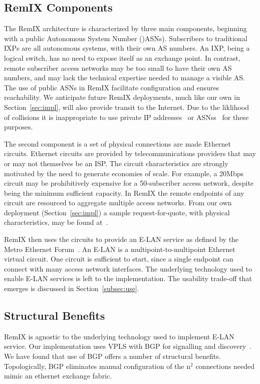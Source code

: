 \subsection{RemIX Components}

The RemIX architecture is characterized by three main components, beginning with
a public Autonomous System Number ()\acp{ASN}). Subscribers to traditional IXPs
are all autonomous systems, with their own AS numbers. An IXP, being a logical
switch, has no need to expose itself as an exchange point. In contrast, remote
subscriber access networks may be too small to have their own AS numbers, and
may lack the technical expertise needed to manage a visible AS. The use of
public ASNs in RemIX facilitate configuration and ensures reachability. We
anticipate future RemIX deployments, much like our own in
Section~\ref{sec:impl}, will also provide transit to the Internet. Due to the
liklihood of collisions it is inappropriate to use private IP
addresses~\cite{rfc1918} or \acp{ASN}s~\cite{rfc6996} for these purposes.

The second component is a set of physical connections are made Ethernet
circuits. Ethernet circuits are provided by telecommunications providers that
may or may not themselves be an ISP. The circuit characteristics are strongly
motivated by the need to generate economies of scale. For example, a 20Mbps
circuit may be prohibitively expensive for a 50-subscriber access network,
despite being the minimum sufficient capacity. In RemIX the remote endpoints of
any circuit are resourced to aggregate multiple access networks. From our own
deployment (Section~\ref{sec:impl}) a sample request-for-quote, with physical
characteristics, may be found at~\cite{rfq}.

RemIX then uses the circuits to provide an E-LAN service as defined by the Metro
Ethernet Forum~\cite{mef62}. An E-LAN is a multipoint-to-multipoint Ethernet
virtual circuit. One circuit is sufficient to start, since a single endpoint can
connect with many access network interfaces. The underlying technology used to
enable E-LAN services is left to the implementation. The usability trade-off 
that emerges is discussed in Section~\ref{subsec:use}.

\subsection{Structural Benefits}

RemIX is agnostic to the underlying technology used to implement E-LAN service.
Our implementation uses VPLS with BGP for signalling and
discovery~\cite{vpls-bgp}. We have found that use of BGP offers a number of
structural benefits. Topologically, BGP eliminates manual configuration of the
n$^2$ connections needed mimic an ethernet exchange fabric.

